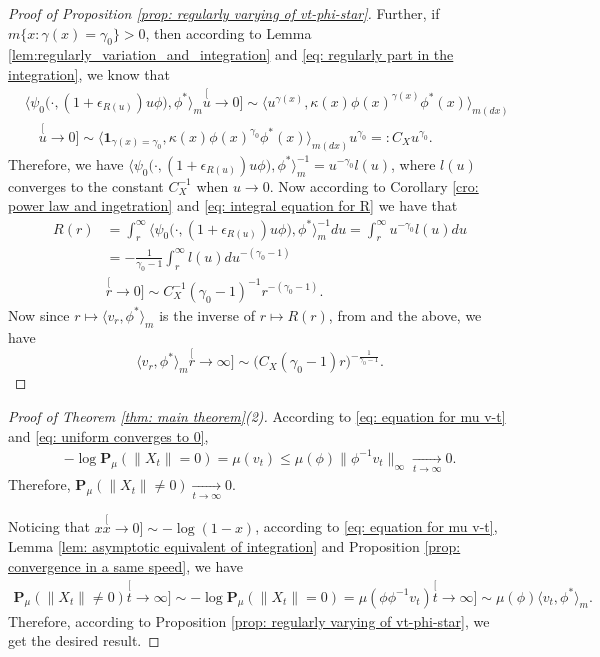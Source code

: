 \documentclass[UTF8]{pkuthss}
\theoremstyle{plain}
\theoremstyle{definition}
\numberwithin{equation}{section}
\begin{document}
\begin{proof}[Proof of Proposition \ref{prop: regularly varying of vt-phi-star}]
	Further, if $m\{x: \gamma(x) = \gamma_0\}> 0$, then according to Lemma \ref{lem:regularly_variation_and_integration} and \eqref{eq: regularly part in the integration}, we know that
\begin{align}
	&\big\langle \psi_0 \big(\cdot,( 1 + \epsilon_{R(u)} ) u \phi \big), \phi^* \big\rangle_m
	\stackrel[u\to 0]{}{\sim}  \langle u^{\gamma(x)} , \kappa (x)\phi(x)^{\gamma(x)} \phi^*(x)
	\rangle_{m(dx)}
	\\ &\quad \stackrel[u\to 0]{}{\sim}  \langle \mathbf 1_{\gamma(x)= \gamma_0}, \kappa (x)\phi(x)^{\gamma_0} \phi^*(x)
	\rangle_{m(dx)} u^{\gamma_0}
	=: C_X u^{\gamma_0}.
\end{align}
	Therefore, we have $\big\langle \psi_0 \big(\cdot,( 1 + \epsilon_{R(u)} ) u \phi \big), \phi^* \big\rangle_m^{-1} = u^{-\gamma_0} l(u)$, where $l(u)$ converges to the constant $C_X^{-1}$ when $u \to 0$.
	Now according to Corollary \ref{cro: power law and ingetration} and \eqref{eq: integral equation for R} we have that
\begin{align}
	R(r)
	&= \int_r^\infty \big\langle \psi_0 \big(\cdot,( 1 + \epsilon_{R(u)} ) u \phi \big), \phi^* \big\rangle_m^{-1} du
	= \int_r^\infty u^{-\gamma_0} l(u) du
	\\&= -\frac{1}{\gamma_0-1}\int_r^\infty l(u) du^{-(\gamma_0 - 1)}
	\\&\stackrel[r\to 0]{}{\sim} C_X^{-1} (\gamma_0-1)^{-1} r^{-(\gamma_0 - 1)}.
\end{align}
	Now since $r\mapsto \langle v_r,\phi^*\rangle_m$ is the inverse of $r\mapsto R(r)$, 
	from \cite[Proposition 1.5.15.]{BinghamGoldieTeugels1989Regular} and the above,
	we have
\begin{equation}
	\langle v_r,\phi^*\rangle_m
	\stackrel[r\to \infty]{}{\sim} \big(C_X (\gamma_0-1) r \big)^{-\frac{1}{\gamma_0 - 1}}. 
\end{equation}
\end{proof}

\begin{proof}[Proof of Theorem \ref{thm: main theorem}(2)]
	According to \eqref{eq: equation for mu v-t} and \eqref{eq: uniform converges to 0},
\begin{align}
	- \log \mathbf P_\mu(\|X_t\| = 0)
	= \mu(v_t)
	\leq \mu(\phi) \| \phi^{-1} v_t\|_{\infty}
	\xrightarrow[t\to \infty]{} 0.
\end{align}
	Therefore, $\mathbf P_\mu(\|X_t\| \neq 0) \xrightarrow[t\to \infty]{} 0$.

	Noticing that $x \stackrel[x\to 0]{}{\sim} - \log(1-x)$, according to \eqref{eq: equation for mu v-t}, Lemma \ref{lem: asymptotic equivalent of integration} and Proposition \ref{prop: convergence in a same speed}, we have
\begin{align}
	\mathbf P_\mu(\|X_t\| \neq 0)
	\stackrel[t\to \infty]{}{\sim} - \log \mathbf P_\mu(\|X_t\| = 0)
	= \mu(\phi \phi^{-1}v_t)
	\stackrel[t\to\infty]{}{\sim} \mu(\phi) \langle v_t, \phi^*\rangle_m.
\end{align}
	Therefore, according to Proposition \ref{prop: regularly varying of vt-phi-star}, we get the desired result.
\end{proof}
\end{document}
